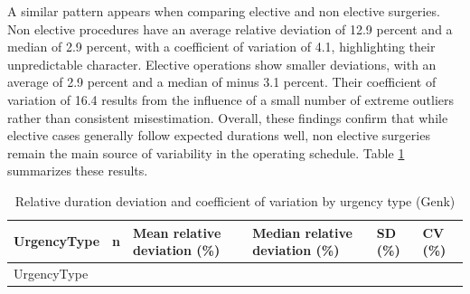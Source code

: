 \documentclass[
]{article}
\begin{document}
A similar pattern appears when comparing elective and non elective
surgeries. Non elective procedures have an average relative deviation of
12.9 percent and a median of 2.9 percent, with a coefficient of
variation of 4.1, highlighting their unpredictable character. Elective
operations show smaller deviations, with an average of 2.9 percent and a
median of minus 3.1 percent. Their coefficient of variation of 16.4
results from the influence of a small number of extreme outliers rather
than consistent misestimation. Overall, these findings confirm that
while elective cases generally follow expected durations well, non
elective surgeries remain the main source of variability in the
operating schedule. Table \ref{tab:rel_dev_urgency} summarizes these
results.

\begin{longtable}[]{@{}
  >{\centering\arraybackslash}p{}
  >{\centering\arraybackslash}p{}
  >{\centering\arraybackslash}p{}
  >{\centering\arraybackslash}p{}
  >{\centering\arraybackslash}p{}
  >{\centering\arraybackslash}p{}@{}}
\caption{Relative duration deviation and coefficient of variation by
urgency type (Genk) \label{tab:rel_dev_urgency}}\tabularnewline
\toprule\noalign{}
\begin{minipage}[b]{\linewidth}\centering
UrgencyType
\end{minipage} & \begin{minipage}[b]{\linewidth}\centering
n
\end{minipage} & \begin{minipage}[b]{\linewidth}\centering
Mean relative deviation (\%)
\end{minipage} & \begin{minipage}[b]{\linewidth}\centering
Median relative deviation (\%)
\end{minipage} & \begin{minipage}[b]{\linewidth}\centering
SD (\%)
\end{minipage} & \begin{minipage}[b]{\linewidth}\centering
CV (\%)
\end{minipage} \\
\midrule\noalign{}
\endfirsthead
\toprule\noalign{}
\begin{minipage}[b]{\linewidth}\centering
UrgencyType
\end{minipage} & \begin{minipage}[b]{\linewidth}\centering

\end{minipage}
\end{longtable}
\end{document}
